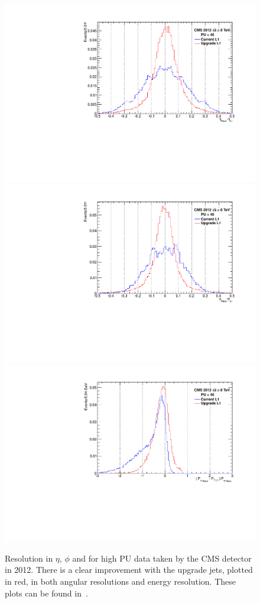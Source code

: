 \begin{figure}[t!]
\begin{center}
  \includegraphics[scale=0.32]{Figures/l1jets//etaRes.pdf}
    \includegraphics[scale=0.32]{Figures/l1jets//phiRes.pdf}
       \includegraphics[scale=0.32]{Figures/l1jets//ptRes.pdf} 
\caption{Resolution in $\eta$, $\phi$ and \pt for high \ac{PU} data taken by the \ac{CMS} detector in 2012. There is a clear improvement with the upgrade jets, plotted in red, in both angular resolutions and energy resolution. These plots can be found in~\cite{Tapper:1556311}.}
\label{JetRes}
\end{center}
\end{figure}

